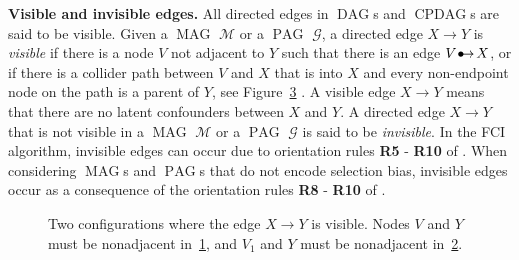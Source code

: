 \documentclass[11pt,a4paper]{article}
\DeclareMathOperator{\CPDAG}{CPDAG}
\DeclareMathOperator{\DAG}{DAG}
\DeclareMathOperator{\MAG}{MAG}
\DeclareMathOperator{\PAG}{PAG}
\newcommand{\g}[1][G]{\mathcal{#1}}
\newcommand{\bulletarrow}{
  \setlength{\unitlength}{1mm}
  \begin{picture}(5,1)(0,0)
    \put(0.2,0){$\bullet$}
    \put(1,0){$\rightarrow$}
  \end{picture}
}
\begin{document}
\textbf{Visible and invisible edges.} All directed edges in $\DAG$s and $\CPDAG$s are said to be visible. Given a $\MAG$ $\g[M]$ or a $\PAG$ $\g$, a directed edge $X \rightarrow Y$ is \textit{visible} if there is a node $V$ not adjacent to $Y$ such that there is an edge $V \bulletarrow X$, or if there is a collider path between $V$ and $X$ that is into $X$ and every non-endpoint node on the path is a parent of $Y$, see Figure~\ref{fig:visible} \citep{zhang2006causal}. A visible edge $X\rightarrow Y$ means that there are no latent confounders between $X$ and $Y$. A directed edge $X \rightarrow Y$ that is not visible in a $\MAG$ $\g[M]$ or a $\PAG$ $\g$ is said to be \textit{invisible}. In the FCI algorithm, invisible edges can occur due to orientation rules \textbf{R5} - \textbf{R10} of \cite{zhang2008completeness}.  
When considering $\MAG$s and $\PAG$s that do not encode selection bias, invisible edges occur as a consequence of the orientation rules \textbf{R8} - \textbf{R10} of \cite{zhang2008completeness}. 

\begin{figure}
\centering
\begin{subfigure}{.25\textwidth}
  \centering
  \caption{}
  \label{visible:sub1}
\end{subfigure}
\hspace{1cm}
\vrule
\begin{subfigure}{.6\textwidth}
  \centering
  \caption{}
  \label{visible:sub2}
\end{subfigure}
\caption{\small Two configurations where the edge $X \rightarrow Y$ is visible. Nodes $V$ and $Y$ must be nonadjacent in~\ref{visible:sub1}, and $V_1$ and $Y$ must be nonadjacent in~\ref{visible:sub2}. }
\label{fig:visible}
\end{figure}
\end{document}
